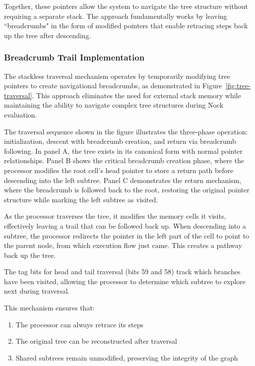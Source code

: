 \documentclass[twoside]{article}
\begin{document}
\noindent
Together, these pointers allow the system to navigate the tree structure without requiring a separate stack. The approach fundamentally works by leaving ``breadcrumbs" in the form of modified pointers that enable retracing steps back up the tree after descending.

\subsubsection{Breadcrumb Trail Implementation}

The stackless traversal mechanism operates by temporarily modifying tree pointers to create navigational breadcrumbs, as demonstrated in Figure~\ref{fig:tree-traversal}. This approach eliminates the need for external stack memory while maintaining the ability to navigate complex tree structures during Nock evaluation.



The traversal sequence shown in the figure illustrates the three-phase operation: initialization, descent with breadcrumb creation, and return via breadcrumb following. In panel A, the tree exists in its canonical form with normal pointer relationships. Panel B shows the critical breadcrumb creation phase, where the processor modifies the root cell's head pointer to store a return path before descending into the left subtree. Panel C demonstrates the return mechanism, where the breadcrumb is followed back to the root, restoring the original pointer structure while marking the left subtree as visited.

As the processor traverses the tree, it modifies the memory cells it visits, effectively leaving a trail that can be followed back up. When descending into a subtree, the processor redirects the pointer in the left part of the cell to point to the parent node, from which execution flow just came. This creates a pathway back up the tree.

The tag bits for head and tail traversal (bits 59 and 58) track which branches have been visited, allowing the processor to determine which subtree to explore next during traversal.

This mechanism ensures that:
\begin{enumerate}
  \item The processor can always retrace its steps
  \item The original tree can be reconstructed after traversal
  \item Shared subtrees remain unmodified, preserving the integrity of the graph
\end{enumerate}
\end{document}
